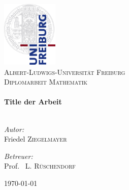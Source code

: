 %
%
% 



\begin{titlepage}

  \begin{center}


    \includegraphics[width=0.2\textwidth]{./images/Uni_Logo-Grundversion_E1_A4_CMYK}\\[1cm]    

    \textsc{\LARGE Albert-Ludwigs-Universität Freiburg}\\[1.5cm]

    \textsc{\Large Diplomarbeit Mathematik}\\[0.5cm]


    \HRule \\[0.4cm]
    { \large \bfseries Title der Arbeit}\\[0.4cm]

    \HRule \\[1.5cm]

    \begin{minipage}{0.4\textwidth}
      \begin{flushleft} \large
        \emph{Autor:}\\
        Friedel \textsc{Ziegelmayer}
      \end{flushleft}
    \end{minipage}
    \begin{minipage}{0.4\textwidth}
      \begin{flushright} \large
        \emph{Betreuer:} \\
        Prof.~ L. \textsc{Rüschendorf}
      \end{flushright}
    \end{minipage}

    \vfill

    {\large \today}

  \end{center}

\end{titlepage}
